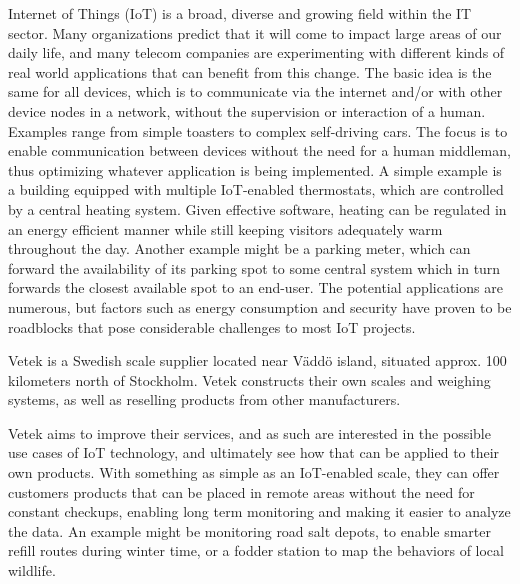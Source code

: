 






Internet of Things (IoT) is a broad, diverse and growing field within the IT sector. Many organizations predict that it will come to impact large areas of our daily life, and many telecom companies are experimenting with different kinds of real world applications that can benefit from this change. The basic idea is the same for all devices, which is to communicate via the internet and/or with other device nodes in a network, without the supervision or interaction of a human. Examples range from simple toasters to complex self-driving cars.\cite{what_is_iot} The focus is to enable communication between devices without the need for a human middleman, thus optimizing whatever application is being implemented. A simple example is a building equipped with multiple IoT-enabled thermostats, which are controlled by a central heating system. Given effective software, heating can be regulated in an energy efficient manner while still keeping visitors adequately warm throughout the day. Another example might be a parking meter, which can forward the availability of its parking spot to some central system which in turn forwards the closest available spot to an end-user. The potential applications are numerous, but factors such as energy consumption and security have proven to be roadblocks that pose considerable challenges to most IoT projects.

Vetek is a Swedish scale supplier located near Väddö island, situated approx. 100 kilometers north of Stockholm. Vetek constructs their own scales and weighing systems, as well as reselling products from other manufacturers.\cite{vetek} 

Vetek aims to improve their services, and as such are interested in the possible use cases of IoT technology, and ultimately see how that can be applied to their own products. With something as simple as an IoT-enabled scale, they can offer customers products that can be placed in remote areas without the need for constant checkups, enabling long term monitoring and making it easier to analyze the data. An example might be monitoring road salt depots, to enable smarter refill routes during winter time, or a fodder station to map the behaviors of local wildlife.

